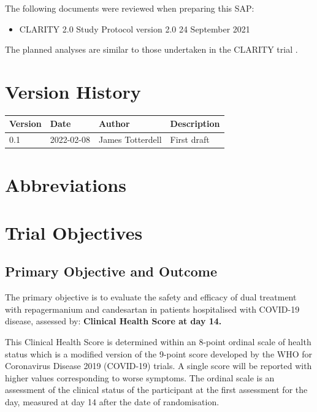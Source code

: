 \documentclass[11pt,parskip=half-]{scrartcl}
\begin{document}
The following documents were reviewed when preparing this SAP:
\begin{itemize}
    \item CLARITY 2.0 Study Protocol version 2.0 24 September 2021
\end{itemize}

The planned analyses are similar to those undertaken in the CLARITY trial \cite{hockham2021protocol, mcgree2021controlled}.

\section*{Version History}

\begin{table}[H]
    \begin{center}
        \begin{tabular}{lllp{5cm}}
            \hline
            Version & Date       & Author           & Description \\
            \hline
            0.1     & 2022-02-08 & James Totterdell & First draft \\
            \hline
        \end{tabular}
    \end{center}
\end{table}

\section*{Abbreviations}

\clearpage

\section{Trial Objectives}

\subsection{Primary Objective and Outcome}
The primary objective is to evaluate the safety and efficacy of dual treatment with repagermanium and candesartan in patients hospitalised with COVID-19 disease, assessed by: \textbf{Clinical Health Score at day 14.}

This Clinical Health Score is determined within an 8-point ordinal scale of health status which is a modified version of the 9-point score developed by the WHO for Coronavirus Disease 2019 (COVID-19) trials. A single score will be reported with higher values corresponding to worse symptoms. The ordinal scale is an assessment of the clinical status of the participant at the first assessment for the day, measured at day 14 after the date of randomisation.
\end{document}
